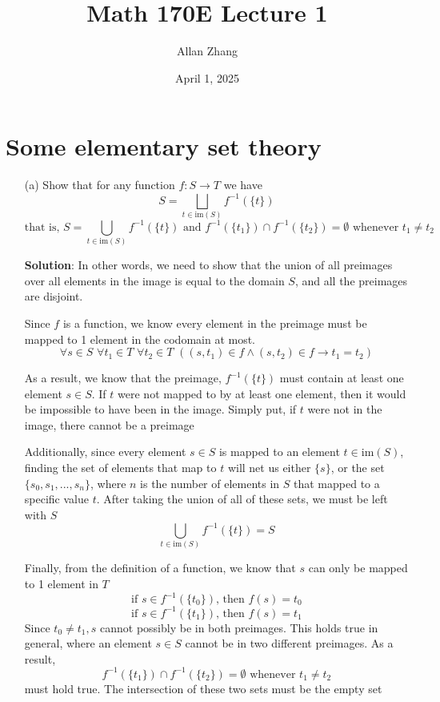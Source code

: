 \documentclass[hidelinks]{article}
\title{\textbf{Math 170E Lecture 1}}
\author{Allan Zhang}
\date{April 1, 2025}
\begin{document}
\hypersetup{bookmarksnumbered=true,}
\pagecolor{white}
\color{black}
\maketitle 
\section*{Some elementary set theory}
\begin{itemize}
    \item[(a)] Show that for any function $f: S \rightarrow T$ we have
        \[
            S = \bigsqcup_{t \in \text{im}(S)} f^{-1}(\{t\}) 
        \]
        $$\text{that is, } S = \bigcup_{t\in \text{im}(S)}f^{-1}(\{t\}) \text{ and } f^{-1}(\{t_1\}) \cap f^{-1}(\{t_2\}) = \emptyset \text{ whenever } t_1 \neq t_2$$
        \item[ ] 
        \textbf{Solution}: In other words, we need to show that the union of all preimages over all elements in the image is equal to the domain $S$, and all the preimages are disjoint.
        \vspace{0.2cm} 

        Since $f$ is a function, we know every element in the preimage must be mapped to 1 element in the codomain at most. 
        \[
            \forall s \in S \, \,\forall t_1 \in T \, \,\forall t_2 \in T \, \, ((s, t_1) \in f \wedge (s, t_2) \in f \rightarrow t_1 = t_2)
        \]
        
        As a result, we know that the preimage, $f^{-1}(\{t\})$ must contain at least one element $s \in S$. If $t$ were not mapped to by at least one element, then it would be impossible to have been in the image. Simply put, if $t$ were not in the image, there cannot be a preimage 
        \vspace{0.2cm} 

        Additionally, since every element $s \in S$ is mapped to an element $t \in \text{im}(S)$, finding the set of elements that map to $t$ will net us either $\{s\}$, or the set $\{s_0, s_1, ..., s_n\}$, where $n$ is the number of elements in $S$ that mapped to a specific value $t$. After taking the union of all of these sets, we must be left with $S$  
        \[
            \bigcup_{t \in \text{im}(S)} f^{-1}(\{t\}) = S
        \]
        
        Finally, from the definition of a function, we know that $s$ can only be mapped to 1 element in $T$
        \[
            \text{if }s \in f^{-1}(\{t_0\}) \text{, then } f(s) = t_0 \]\[
            \text{if }s \in f^{-1}(\{t_1\}) \text{, then } f(s) = t_1 \]\[
        \]
        Since $t_0 \neq t_1, s$ cannot possibly be in both preimages. This holds true in general, where an element $s \in S$ cannot be in two different preimages. As a result, 
        \[
        f^{-1}(\{t_1\}) \cap f^{-1}(\{t_2\}) = \emptyset \text{ whenever } t_1 \neq t_2
        \]
        must hold true. The intersection of these two sets must be the empty set
        \vspace{0.2cm} 
        

\end{itemize}
\end{document}
